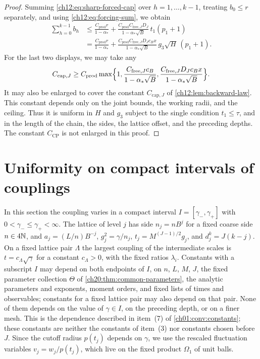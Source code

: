 \begin{proof}
Summing \eqref{ch12:eq:sharp-forced-cap} over $h=1,\ldots,k-1$, treating $b_0\le r$ separately, and using \eqref{ch12:eq:forcing-sum}, we obtain
\begin{equation}
 \begin{split}
 \sum_{h=0}^{k-1}b_h
 &\le\frac{C_{\mathrm{prod}}r}{1-\alpha_*}+\frac{C_{\mathrm{prod}}C_{\mathrm{free},J}D_J}{1-\alpha_*\sqrt B}\,t_1(p_1+1)\\
 &=\frac{C_{\mathrm{prod}}r}{1-\alpha_*}+\frac{C_{\mathrm{prod}}C_{\mathrm{free},J}D_Jc_Bx}{1-\alpha_*\sqrt B}\,g_3\sqrt H\,(p_1+1).
 \end{split}\label{ch12:eq:sharp-cap-sum}
\end{equation}
For the last two displays, we may take any
\begin{equation}
 C_{\mathrm{cap},J}\ge C_{\mathrm{prod}}\max\Bigl\{1,\frac{C_{\mathrm{free},J}c_B}{1-\alpha_*\sqrt B},\frac{C_{\mathrm{free},J}D_Jc_Bx}{1-\alpha_*\sqrt B}\Bigr\}. \label{ch12:eq:uniform-cap-constant}
\end{equation}
It may also be enlarged to cover the constant $C_{\mathrm{cap},J}$ of \cref{ch12:lem:backward-law}. This constant depends only on the joint bounds, the working radii, and the ceiling. Thus it is uniform in $H$ and $g_3$ subject to the single condition $t_1\le\tau$, and in the length of the chain, the sides, the lattice offset, and the preceding depths. The constant $C_{\mathrm{CP}}$ is not enlarged in this proof.
\end{proof}

\section{Uniformity on compact intervals of couplings}\label{ch12:sec:compact}

In this section the coupling varies in a compact interval $I=[\gamma_-,\gamma_+]$ with $0<\gamma_-\le\gamma_+<\infty$. The lattice of level $j$ has side $n_j=nB^j$ for a fixed coarse side $n\in4\mathbb N$, and $a_j=(L/n)B^{-j}$, $g_j^2=\gamma/n_j$, $t_j=M^{(J-1)/2}g_j$, and $d_j^k=J(k-j)$. On a fixed lattice pair $\Lambda$ the largest coupling of the intermediate scales is $t=c_\Lambda\sqrt\gamma$ for a constant $c_\Lambda>0$, with the fixed ratios $\lambda_i$. Constants with a subscript $I$ may depend on both endpoints of $I$, on $n$, $L$, $M$, $J$, the fixed parameter collection $\Theta$ of \cref{ch20:thm:common-parameters}, the analytic parameters and exponents, moment orders, and fixed lists of times and observables; constants for a fixed lattice pair may also depend on that pair. None of them depends on the value of $\gamma\in I$, on the preceding depth, or on a finer mesh. This is the dependence described in item~(7) of \cref{ch01:conv:constants}; these constants are neither the constants of item~(3) nor constants chosen before $J$. Since the cutoff radius $p(t_j)$ depends on $\gamma$, we use the rescaled fluctuation variables $v_j=w_j/p(t_j)$, which live on the fixed product $\Omega_1$ of unit balls.

